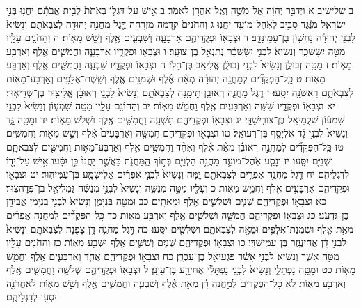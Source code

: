 \documentclass[twoside, openany, parskip=half, 11pt]{book}
\begin{document}
ב שלישיב א וַיְדַבֵּ֣ר יְהֹוָ֔ה אֶל־מֹשֶׁ֥ה וְאֶֽל־אַהֲרֹ֖ן לֵאמֹֽר׃ ב אִ֣ישׁ עַל־דִּגְל֤וֹ בְאֹתֹת֙ לְבֵ֣ית אֲבֹתָ֔ם יַחֲנ֖וּ בְּנֵ֣י יִשְׂרָאֵ֑ל מִנֶּ֕גֶד סָבִ֥יב לְאֹֽהֶל־מוֹעֵ֖ד יַחֲנֽוּ׃ ג וְהַחֹנִים֙ קֵ֣דְמָה מִזְרָ֔חָה דֶּ֛גֶל מַחֲנֵ֥ה יְהוּדָ֖ה לְצִבְאֹתָ֑ם וְנָשִׂיא֙ לִבְנֵ֣י יְהוּדָ֔ה נַחְשׁ֖וֹן בֶּן־עַמִּינָדָֽב׃ ד וּצְבָא֖וֹ וּפְקֻדֵיהֶ֑ם אַרְבָּעָ֧ה וְשִׁבְעִ֛ים אֶ֖לֶף וְשֵׁ֥שׁ מֵאֽוֹת׃ ה וְהַחֹנִ֥ים עָלָ֖יו מַטֵּ֣ה יִשָּׂשכָ֑ר וְנָשִׂיא֙ לִבְנֵ֣י יִשָּׂשכָ֔ר נְתַנְאֵ֖ל בֶּן־צוּעָֽר׃ ו וּצְבָא֖וֹ וּפְקֻדָ֑יו אַרְבָּעָ֧ה וַחֲמִשִּׁ֛ים אֶ֖לֶף וְאַרְבַּ֥ע מֵאֽוֹת׃ ז מַטֵּ֖ה זְבוּלֻ֑ן וְנָשִׂיא֙ לִבְנֵ֣י זְבוּלֻ֔ן אֱלִיאָ֖ב בֶּן־חֵלֹֽן׃ ח וּצְבָא֖וֹ וּפְקֻדָ֑יו שִׁבְעָ֧ה וַחֲמִשִּׁ֛ים אֶ֖לֶף וְאַרְבַּ֥ע מֵאֽוֹת׃ ט כׇּֽל־הַפְּקֻדִ֞ים לְמַחֲנֵ֣ה יְהוּדָ֗ה מְאַ֨ת אֶ֜לֶף וּשְׁמֹנִ֥ים אֶ֛לֶף וְשֵֽׁשֶׁת־אֲלָפִ֥ים וְאַרְבַּע־מֵא֖וֹת לְצִבְאֹתָ֑ם רִאשֹׁנָ֖ה יִסָּֽעוּ׃
י דֶּ֣גֶל מַחֲנֵ֧ה רְאוּבֵ֛ן תֵּימָ֖נָה לְצִבְאֹתָ֑ם וְנָשִׂיא֙ לִבְנֵ֣י רְאוּבֵ֔ן אֱלִיצ֖וּר בֶּן־שְׁדֵיאֽוּר׃ יא וּצְבָא֖וֹ וּפְקֻדָ֑יו שִׁשָּׁ֧ה וְאַרְבָּעִ֛ים אֶ֖לֶף וַחֲמֵ֥שׁ מֵאֽוֹת׃ יב וְהַחוֹנִ֥ם עָלָ֖יו מַטֵּ֣ה שִׁמְע֑וֹן וְנָשִׂיא֙ לִבְנֵ֣י שִׁמְע֔וֹן שְׁלֻמִיאֵ֖ל בֶּן־צוּרִֽישַׁדָּֽי׃ יג וּצְבָא֖וֹ וּפְקֻדֵיהֶ֑ם תִּשְׁעָ֧ה וַחֲמִשִּׁ֛ים אֶ֖לֶף וּשְׁלֹ֥שׁ מֵאֽוֹת׃ יד וּמַטֵּ֖ה גָּ֑ד וְנָשִׂיא֙ לִבְנֵ֣י גָ֔ד אֶלְיָסָ֖ף בֶּן־רְעוּאֵֽל׃ טו וּצְבָא֖וֹ וּפְקֻדֵיהֶ֑ם חֲמִשָּׁ֤ה וְאַרְבָּעִים֙ אֶ֔לֶף וְשֵׁ֥שׁ מֵא֖וֹת וַחֲמִשִּֽׁים׃ טז כׇּֽל־הַפְּקֻדִ֞ים לְמַחֲנֵ֣ה רְאוּבֵ֗ן מְאַ֨ת אֶ֜לֶף וְאֶחָ֨ד וַחֲמִשִּׁ֥ים אֶ֛לֶף וְאַרְבַּע־מֵא֥וֹת וַחֲמִשִּׁ֖ים לְצִבְאֹתָ֑ם וּשְׁנִיִּ֖ם יִסָּֽעוּ׃
יז וְנָסַ֧ע אֹֽהֶל־מוֹעֵ֛ד מַחֲנֵ֥ה הַלְוִיִּ֖ם בְּת֣וֹךְ הַֽמַּחֲנֹ֑ת כַּאֲשֶׁ֤ר יַחֲנוּ֙ כֵּ֣ן יִסָּ֔עוּ אִ֥ישׁ עַל־יָד֖וֹ לְדִגְלֵיהֶֽם׃
יח דֶּ֣גֶל מַחֲנֵ֥ה אֶפְרַ֛יִם לְצִבְאֹתָ֖ם יָ֑מָּה וְנָשִׂיא֙ לִבְנֵ֣י אֶפְרַ֔יִם אֱלִישָׁמָ֖ע בֶּן־עַמִּיהֽוּד׃ יט וּצְבָא֖וֹ וּפְקֻדֵיהֶ֑ם אַרְבָּעִ֥ים אֶ֖לֶף וַחֲמֵ֥שׁ מֵאֽוֹת׃ כ וְעָלָ֖יו מַטֵּ֣ה מְנַשֶּׁ֑ה וְנָשִׂיא֙ לִבְנֵ֣י מְנַשֶּׁ֔ה גַּמְלִיאֵ֖ל בֶּן־פְּדָהצֽוּר׃ כא וּצְבָא֖וֹ וּפְקֻדֵיהֶ֑ם שְׁנַ֧יִם וּשְׁלֹשִׁ֛ים אֶ֖לֶף וּמָאתָֽיִם׃ כב וּמַטֵּ֖ה בִּנְיָמִ֑ן וְנָשִׂיא֙ לִבְנֵ֣י בִנְיָמִ֔ן אֲבִידָ֖ן בֶּן־גִּדְעֹנִֽי׃ כג וּצְבָא֖וֹ וּפְקֻדֵיהֶ֑ם חֲמִשָּׁ֧ה וּשְׁלֹשִׁ֛ים אֶ֖לֶף וְאַרְבַּ֥ע מֵאֽוֹת׃ כד כׇּֽל־הַפְּקֻדִ֞ים לְמַחֲנֵ֣ה אֶפְרַ֗יִם מְאַ֥ת אֶ֛לֶף וּשְׁמֹֽנַת־אֲלָפִ֥ים וּמֵאָ֖ה לְצִבְאֹתָ֑ם וּשְׁלִשִׁ֖ים יִסָּֽעוּ׃
כה דֶּ֣גֶל מַחֲנֵ֥ה דָ֛ן צָפֹ֖נָה לְצִבְאֹתָ֑ם וְנָשִׂיא֙ לִבְנֵ֣י דָ֔ן אֲחִיעֶ֖זֶר בֶּן־עַמִּֽישַׁדָּֽי׃ כו וּצְבָא֖וֹ וּפְקֻדֵיהֶ֑ם שְׁנַ֧יִם וְשִׁשִּׁ֛ים אֶ֖לֶף וּשְׁבַ֥ע מֵאֽוֹת׃ כז וְהַחֹנִ֥ים עָלָ֖יו מַטֵּ֣ה אָשֵׁ֑ר וְנָשִׂיא֙ לִבְנֵ֣י אָשֵׁ֔ר פַּגְעִיאֵ֖ל בֶּן־עׇכְרָֽן׃ כח וּצְבָא֖וֹ וּפְקֻדֵיהֶ֑ם אֶחָ֧ד וְאַרְבָּעִ֛ים אֶ֖לֶף וַחֲמֵ֥שׁ מֵאֽוֹת׃ כט וּמַטֵּ֖ה נַפְתָּלִ֑י וְנָשִׂיא֙ לִבְנֵ֣י נַפְתָּלִ֔י אֲחִירַ֖ע בֶּן־עֵינָֽן׃ ל וּצְבָא֖וֹ וּפְקֻדֵיהֶ֑ם שְׁלֹשָׁ֧ה וַחֲמִשִּׁ֛ים אֶ֖לֶף וְאַרְבַּ֥ע מֵאֽוֹת׃ לא כׇּל־הַפְּקֻדִים֙ לְמַ֣חֲנֵה דָ֔ן מְאַ֣ת אֶ֗לֶף וְשִׁבְעָ֧ה וַחֲמִשִּׁ֛ים אֶ֖לֶף וְשֵׁ֣שׁ מֵא֑וֹת לָאַחֲרֹנָ֥ה יִסְע֖וּ לְדִגְלֵיהֶֽם׃
\end{document}
